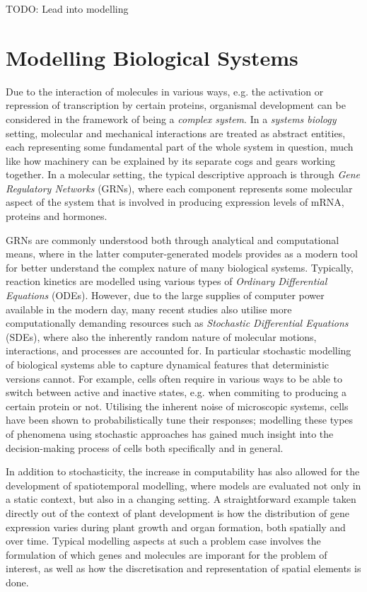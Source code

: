 TODO: Lead into modelling

\section{Modelling Biological Systems} %
Due to the interaction of molecules in various ways, e.g. the activation or
repression of transcription by certain proteins, organismal development can be
considered in the framework of being a \textit{complex system}. In a
\textit{systems biology} setting, molecular and mechanical interactions are
treated as abstract entities, each representing some fundamental part of the
whole system in question, much like how machinery can be explained by its
separate cogs and gears working together. In a molecular setting, the typical
descriptive approach is through \textit{Gene Regulatory Networks} (GRNs), where
each component represents some molecular aspect of the system that is involved in
producing expression levels of mRNA, proteins and hormones. \CITE

GRNs are commonly understood both through analytical and computational means,
where in the latter computer-generated models provides as a modern tool for
better understand the complex nature of many biological systems. Typically,
reaction kinetics are modelled using various types of \textit{Ordinary
  Differential Equations} (ODEs). However, due to the large supplies of computer
power available in the modern day, many recent studies also utilise more
computationally demanding resources such as \textit{Stochastic Differential
  Equations} (SDEs), where also the inherently random nature of molecular
motions, interactions, and processes are accounted for. In particular stochastic
modelling of biological systems able to capture dynamical features that
deterministic versions cannot. For example, cells often require in various ways to be
able to switch between active and inactive states, e.g. when commiting to
producing a certain protein or not. Utilising the inherent noise of microscopic
systems, cells have been shown to probabilistically tune their responses; \CITE 
modelling these types of phenomena using stochastic approaches has gained much
insight into the decision-making process of cells both specifically and in
general. \CITE 

In addition to stochasticity, the increase in computability has also allowed for the development of
spatiotemporal modelling,   where models are evaluated not only in a static
context, but also in a changing  
setting. A straightforward example taken directly out of the context of plant
development is how the distribution of gene expression varies during plant
growth and organ formation, both spatially and over time. Typical modelling
aspects at such a problem case involves the formulation of which genes and
molecules are imporant for the problem of interest, as well as how the
discretisation and representation of spatial elements is done. \CITE

